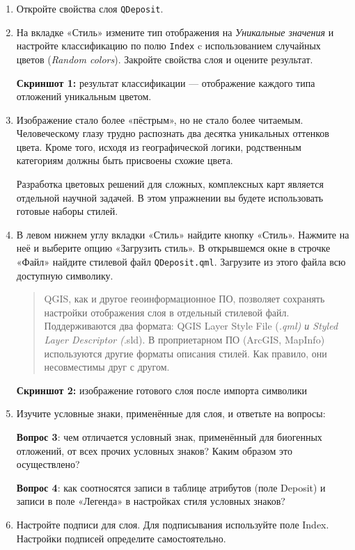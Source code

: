 \documentclass[
  12pt,
]{book}
\begin{document}
\begin{enumerate}
\def\labelenumi{\arabic{enumi}.}
\item
  Откройте свойства слоя \texttt{QDeposit}.
\item
  На вкладке «Стиль» измените тип отображения на \emph{Уникальные значения} и настройте классификацию по полю \texttt{Index} c использованием случайных цветов (\emph{Random colors}). Закройте свойства слоя и оцените результат.

  \textbf{Скриншот 1:} результат классификации --- отображение каждого типа отложений уникальным цветом.
\item
  Изображение стало более «пёстрым», но не стало более читаемым. Человеческому глазу трудно распознать два десятка уникальных оттенков цвета. Кроме того, исходя из географической логики, родственным категориям должны быть присвоены схожие цвета.

  Разработка цветовых решений для сложных, комплексных карт является отдельной научной задачей. В этом упражнении вы будете использовать готовые наборы стилей.
\item
  В левом нижнем углу вкладки «Стиль» найдите кнопку «Стиль». Нажмите на неё и выберите опцию «Загрузить стиль». В открывшемся окне в строчке «Файл» найдите стилевой файл \texttt{QDeposit.qml}. Загрузите из этого файла всю доступную символику.

  \begin{quote}
  QGIS, как и другое геоинформационное ПО, позволяет сохранять настройки отображения слоя в отдельный стилевой файл. Поддерживаются два формата: QGIS Layer Style File (\emph{.qml) и Styled Layer Descriptor (}.sld). В проприетарном ПО (ArcGIS, MapInfo) используются другие форматы описания стилей. Как правило, они несовместимы друг с другом.
  \end{quote}

  \textbf{Скриншот 2:} изображение готового слоя после импорта символики
\item
  Изучите условные знаки, применённые для слоя, и ответьте на вопросы:

  \textbf{Вопрос 3}: чем отличается условный знак, применённый для биогенных отложений, от всех прочих условных знаков? Каким образом это осуществлено?

  \textbf{Вопрос 4}: как соотносятся записи в таблице атрибутов (поле Deposit) и записи в поле «Легенда» в настройках стиля условных знаков?
\item
  Настройте подписи для слоя. Для подписывания используйте поле Index. Настройки подписей определите самостоятельно.
\end{enumerate}
\end{document}
